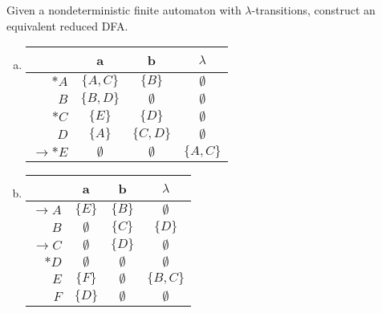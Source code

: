 \documentclass[a4paper,12pt]{amsart}
\begin{document}
\medskip\begin{problem}

    Given a nondeterministic finite automaton with  $\lambda$-transitions, construct an equivalent reduced DFA.
    
    \begin{multicols}{2}\small
    
        \begin{enumerate}[(a)]

            \item \begin{tabular}{ r | c c c }
            & a & b & $\lambda$ \\ \hline
            $\ast A$ & $\{A,C\}$ & $\{B\}$ & $\emptyset$ \\
            $B$ & $\{B,D\}$ & $\emptyset$ & $\emptyset$ \\
            $\ast C$ & $\{E\}$ & $\{D\}$ & $\emptyset$ \\
            $D$ & $\{A\}$ & $\{C,D\}$ & $\emptyset$ \\
            $\to\ast E$ & $\emptyset$ & $\emptyset$ & $\{A,C\}$
            \end{tabular}
            
            \item \begin{tabular}{ r | c c c }
            & a & b & $\lambda$ \\ \hline
            $\to A$ & $\{E\}$ & $\{B\}$ & $\emptyset$ \\
            $B$ & $\emptyset$ & $\{C\}$ & $\{D\}$ \\
            $\to C$ & $\emptyset$ & $\{D\}$ & $\emptyset$ \\
            $\ast D$ & $\emptyset$ & $\emptyset$ & $\emptyset$ \\
            $E$ & $\{F\}$ & $\emptyset$ & $\{B,C\}$\\
            $F$ & $\{D\}$ & $\emptyset$ & $\emptyset$
            \end{tabular}
    
        \end{enumerate}
    
    \end{multicols}

\end{problem}
\end{document}
